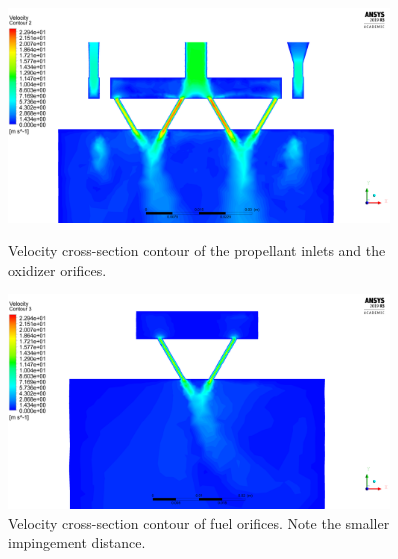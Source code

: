 \documentclass[9pt]{article} %
\numberwithin{equation}{section} %
\begin{document}
\begin{figure}
    \centering
    \begin{minipage}{0.49\textwidth}
        \centering
        \includegraphics[scale=0.5, width=0.9\textwidth]{sim_files/vel_xsect4.png} %
        \caption{Velocity cross-section contour of the propellant inlets and the oxidizer orifices.}
        \label{fig:velocity_contour_1}
    \end{minipage}\hfill
    \begin{minipage}{0.49\textwidth}
        \centering
        \includegraphics[scale=0.5, width=0.9\textwidth]{sim_files/vel_xsect3.png} %
        \caption{Velocity cross-section contour of fuel orifices. Note the smaller impingement distance.}
        \label{fig:velocity_contour_2}
    \end{minipage}
\end{figure} 
\end{document}
